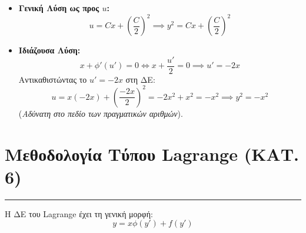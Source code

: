 \documentclass[12pt,a4paper]{article}
\begin{document}
\begin{itemize}
    \item \textbf{Γενική Λύση ως προς $u$:}
    \[
    u = C x + \left(\frac{C}{2}\right)^2 \implies y^2 = C x + \left(\frac{C}{2}\right)^2
    \]
    
    \item \textbf{Ιδιάζουσα Λύση:}
    \[
    x + \phi'(u') = 0 \iff x + \frac{u'}{2} = 0 \implies u' = -2x
    \]
    Αντικαθιστώντας το $u' = -2x$ στη ΔΕ:
    \[
    u = x(-2x) + \left(\frac{-2x}{2}\right)^2 = -2x^2 + x^2 = -x^2 \implies y^2 = -x^2
    \]
    (\textit{Αδύνατη στο πεδίο των πραγματικών αριθμών}).
\end{itemize}

\section*{Μεθοδολογία Τύπου Lagrange (ΚΑΤ. 6)}
\vspace{-1em}
\hrule
\vspace{1em}


Η ΔΕ του Lagrange έχει τη γενική μορφή:
\[
y = x \phi(y') + f(y')
\]
\end{document}
